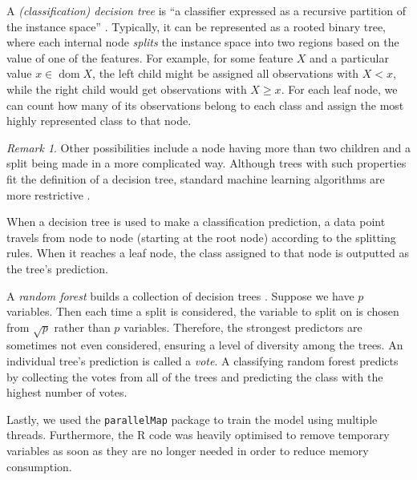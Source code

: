 \documentclass{l4proj}
\theoremstyle{definition}
\theoremstyle{remark}
\newtheorem{remark}{Remark}[chapter]
\DeclareMathOperator{\dom}{dom}
\begin{document}
A \emph{(classification) decision tree} is ``a classifier expressed as a
recursive partition of the instance space'' \cite{DBLP:series/smpai/RokachM14}.
Typically, it can be represented as a rooted binary tree, where each internal
node \emph{splits} the instance space into two regions based on the value of one
of the features. For example, for some feature $X$ and a particular value $x \in
\dom{X}$, the left child might be assigned all observations with $X < x$, while
the right child would get observations with $X \ge x$. For each leaf node, we
can count how many of its observations belong to each class and assign the most
highly represented class to that node.

\begin{remark}
  Other possibilities include a node having more than two children and a split
  being made in a more complicated way. Although trees with such properties fit
  the definition of a decision tree, standard machine learning algorithms are
  more restrictive \cite{James:2014:ISL:2517747, DBLP:series/smpai/RokachM14}.
\end{remark}

When a decision tree is used to make a classification prediction, a data point
travels from node to node (starting at the root node) according to the splitting
rules. When it reaches a leaf node, the class assigned to that node is outputted
as the tree's prediction.

A \emph{random forest} builds a collection of decision trees
\cite{James:2014:ISL:2517747}. Suppose we have $p$ variables. Then each time a
split is considered, the variable to split on is chosen from $\sqrt{p}$ rather
than $p$ variables. Therefore, the strongest predictors are sometimes not even
considered, ensuring a level of diversity among the trees. An individual tree's
prediction is called a \emph{vote}. A classifying random forest predicts by
collecting the votes from all of the trees and predicting the class with the
highest number of votes.

Lastly, we used the \texttt{parallelMap} package to train the model using
multiple threads. Furthermore, the R code was heavily optimised to remove
temporary variables as soon as they are no longer needed in order to reduce
memory consumption.
\end{document}
